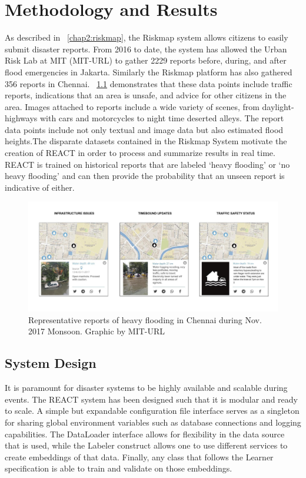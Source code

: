 \chapter{Methodology and Results}
As described in \sectionautoref~\ref{chap2:riskmap}, the Riskmap system allows
citizens to easily submit disaster reports. From 2016 to date, the system has
allowed the Urban Risk Lab at MIT (MIT-URL) to gather 2229 reports before,
during, and after flood
emergencies in Jakarta. Similarly the Riskmap platform has also gathered 356
reports in Chennai. \figureautorefname{}~\ref{fig:ch_typical_reports} demonstrates
that these data points include traffic reports, indications
that an area is unsafe, and advice for other citizens in the area.  Images
attached to reports include a wide variety of scenes, from daylight-highways
with cars and motorcycles to night time deserted alleys. The report data points
include not only textual and image data but also estimated flood heights.The
disparate datasets contained in the Riskmap System motivate the creation of
REACT in order to process and summarize results in real time. REACT is trained
on historical reports that are labeled `heavy flooding' or `no heavy flooding'
and can then provide the probability that an unseen report is indicative of
either.

\begin{figure}[h]
    \centering
    \captionsetup{justification=centering}
    \includegraphics[width=\textwidth]{images/ch/riskmap_reports.jpg}
    \caption{Representative reports of heavy flooding in Chennai during Nov.
    2017 Monsoon. Graphic by MIT-URL}\label{fig:ch_typical_reports}
\end{figure}

\section{System Design}
It is paramount for disaster systems to be highly available and scalable during
events. The REACT system has been designed such that it is modular and ready to
scale. A simple but expandable configuration file interface serves as a
singleton for sharing global environment variables such as database connections
and logging capabilities. The DataLoader interface allows for flexibility in the
data source that is used, while the Labeler construct allows one to use
different services to create embeddings of that data. Finally, any class that
follows the Learner specification is able to train and validate on those
embeddings.


